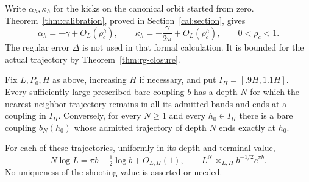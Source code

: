 Write $\alpha_h,\kappa_h$ for the kicks on the canonical orbit
started from zero.  Theorem~\ref{thm:calibration}, proved in Section~\ref{cal:section}, gives
\begin{equation}
 \alpha_h=-\gamma+O_L(\rho_c^h),\qquad
 \kappa_h=-\frac{\gamma}{2\pi}+O_L(\rho_c^h),
 \qquad 0<\rho_c<1 .
 \label{rg:calibrated-kicks}
\end{equation}
The regular error $\Delta$ is not used in that formal
calculation.  It is bounded for the actual trajectory by
Theorem~\ref{thm:rg-closure}.

\begin{proposition}
\label{rg:admission}
Fix $L,P_0,H$ as above, increasing $H$ if necessary, and put
$I_H=[.9H,1.1H]$.  Every sufficiently large prescribed bare
coupling $b$ has a depth $N$ for which the nearest-neighbor
trajectory remains in all its admitted bands and ends at a
coupling in $I_H$.  Conversely, for every $N\ge1$ and every
$h_0\in I_H$ there is a bare coupling $b_N(h_0)$ whose admitted
trajectory of depth $N$ ends exactly at $h_0$.

For each of these trajectories, uniformly in its depth and
terminal value,
\begin{equation}
 N\log L=\pi b-\tfrac12\log b+O_{L,H}(1),
 \qquad
 L^N\asymp_{L,H} b^{-1/2}e^{\pi b}.
 \label{rg:scale-calibration}
\end{equation}
No uniqueness of the shooting value is asserted or needed.
\end{proposition}
